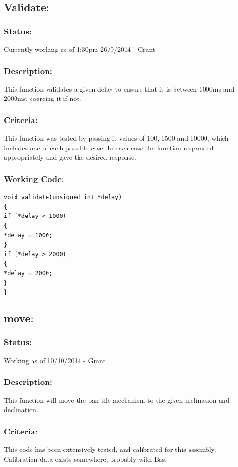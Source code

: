 \documentclass[]{report}
\begin{document}
\subsection{Validate:}
\subsubsection{Status:}
Currently working as of 1:30pm 26/9/2014 - Grant

\subsubsection{Description:}
This function validates a given delay to ensure that it is between 1000ms and 2000ms, coercing it if not.

\subsubsection{Criteria:}
This function was tested by passing it values of 100, 1500 and 10000, which includes one of each possible case. In each case the function responded appropriately and gave the desired response.

\subsubsection{Working Code:}
\begin{lstlisting}
void validate(unsigned int *delay)
{
if (*delay < 1000)
{
*delay = 1000;
}
if (*delay > 2000)
{
*delay = 2000;
}
}
\end{lstlisting}

\subsection{move:}
\subsubsection{Status:}
Working as of 10/10/2014 - Grant

\subsubsection{Description:} 
This function will move the pan tilt mechanism to the given inclination and declination.

\subsubsection{Criteria:}
This code has been extensively tested, and calibrated for this assembly. Calibration data exists somewhere, probably with Bas.
\end{document}
